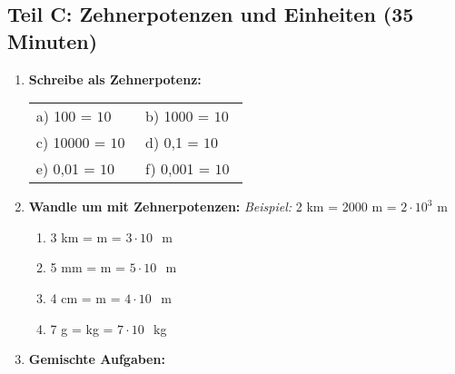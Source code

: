 \subsection*{Teil C: Zehnerpotenzen und Einheiten (35 Minuten)}

\begin{enumerate}[label=\arabic*.]

    \item \textbf{Schreibe als Zehnerpotenz:}
    \vspace{0.5cm}

    \begin{tabular}{ll}
        a) 100 = $10^{\phantom{0}}$ & b) 1000 = $10^{\phantom{0}}$ \\[2ex]
        c) 10000 = $10^{\phantom{0}}$ & d) 0,1 = $10^{\phantom{0}}$ \\[2ex]
        e) 0,01 = $10^{\phantom{0}}$ & f) 0,001 = $10^{\phantom{0}}$
    \end{tabular}

    \vspace{1cm}

    \item \textbf{Wandle um mit Zehnerpotenzen:}
    \textit{Beispiel:} 2 km = 2000 m = $2 \cdot 10^3$ m
    \vspace{0.5cm}

    \begin{enumerate}[label=\alph*)]
        \item 3 km = \underline{\hspace{2cm}} m = $3 \cdot 10^{\phantom{0}}$ m
        \vspace{0.5cm}

        \item 5 mm = \underline{\hspace{2cm}} m = $5 \cdot 10^{\phantom{0}}$ m
        \vspace{0.5cm}

        \item 4 cm = \underline{\hspace{2cm}} m = $4 \cdot 10^{\phantom{0}}$ m
        \vspace{0.5cm}

        \item 7 g = \underline{\hspace{2cm}} kg = $7 \cdot 10^{\phantom{0}}$ kg
    \end{enumerate}

    \vspace{1cm}

    \item \textbf{Gemischte Aufgaben:}
    \vspace{0.5cm}


\end{enumerate}
